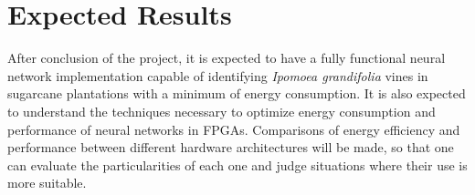 \documentclass[
    12pt,                       %
    oneside,                    %
    a4paper,                    %
    brazil,                     %
    french,                     %
    spanish,                    %
    english,                    %
    ]{abntex2}
\begin{document}
\chapter{Expected Results}


  After conclusion of the project, it is expected to have a fully functional neural network implementation capable of identifying \textit{Ipomoea grandifolia} vines in sugarcane plantations with a minimum of energy consumption. It is also expected to understand the techniques necessary to optimize energy consumption and performance of neural networks in FPGAs. Comparisons of energy efficiency and performance between different hardware architectures will be made, so that one can evaluate the particularities of each one and judge situations where their use is more suitable.


\postextual


\printbibliography

\end{document}

